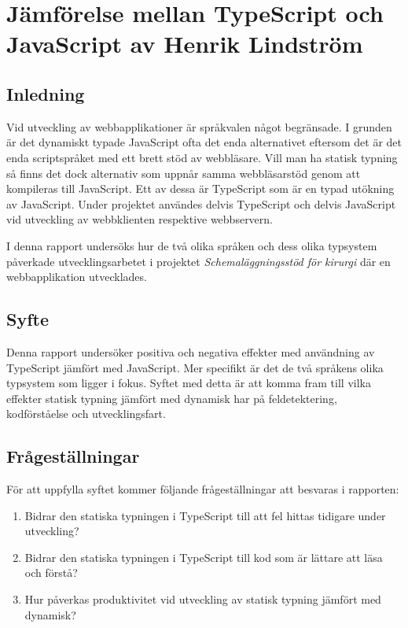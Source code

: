 \chapter{Jämförelse mellan TypeScript och JavaScript av Henrik Lindström}

\section{Inledning}
Vid utveckling av webbapplikationer är språkvalen något begränsade. I grunden är det dynamiskt typade JavaScript ofta det enda alternativet eftersom det är det enda scriptspråket med ett brett stöd av webbläsare. Vill man ha statisk typning så finns det dock alternativ som uppnår samma webbläsarstöd genom att kompileras till JavaScript. Ett av dessa är TypeScript som är en typad utökning av JavaScript. Under projektet användes delvis TypeScript och delvis JavaScript vid utveckling av webbklienten respektive webbservern.

I denna rapport undersöks hur de två olika språken och dess olika typsystem påverkade utvecklingsarbetet i projektet \textit{Schemaläggningsstöd för kirurgi} där en webbapplikation utvecklades.
\section{Syfte}
Denna rapport undersöker positiva och negativa effekter med användning av TypeScript jämfört med JavaScript. Mer specifikt är det de två språkens olika typsystem som ligger i fokus. Syftet med detta är att komma fram till vilka effekter statisk typning jämfört med dynamisk har på feldetektering, kodförståelse och utvecklingsfart. 

\section{Frågeställningar}
För att uppfylla syftet kommer följande frågeställningar att besvaras i rapporten:
\begin{enumerate}
\item Bidrar den statiska typningen i TypeScript till att fel hittas tidigare under utveckling?
\item Bidrar den statiska typningen i TypeScript till kod som är lättare att läsa och förstå?
\item Hur påverkas produktivitet vid utveckling av statisk typning jämfört med dynamisk?
\end{enumerate}
